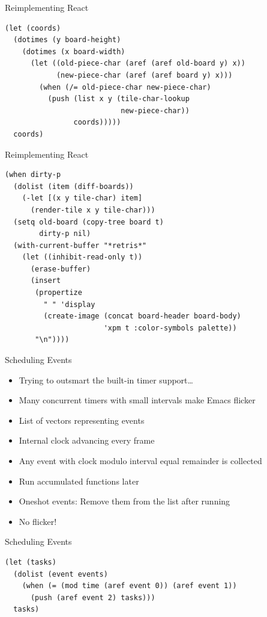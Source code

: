 \documentclass[presentation]{beamer}
\begin{document}
\begin{frame}[fragile,label=sec-4-10]{Reimplementing React}
 \begin{verbatim}
(let (coords)
  (dotimes (y board-height)
    (dotimes (x board-width)
      (let ((old-piece-char (aref (aref old-board y) x))
            (new-piece-char (aref (aref board y) x)))
        (when (/= old-piece-char new-piece-char)
          (push (list x y (tile-char-lookup
                           new-piece-char))
                coords)))))
  coords)
\end{verbatim}
\end{frame}

\begin{frame}[fragile,label=sec-4-11]{Reimplementing React}
 \begin{verbatim}
(when dirty-p
  (dolist (item (diff-boards))
    (-let [(x y tile-char) item]
      (render-tile x y tile-char)))
  (setq old-board (copy-tree board t)
        dirty-p nil)
  (with-current-buffer "*retris*"
    (let ((inhibit-read-only t))
      (erase-buffer)
      (insert
       (propertize
         " " 'display
         (create-image (concat board-header board-body)
                       'xpm t :color-symbols palette))
       "\n"))))
\end{verbatim}
\end{frame}

\begin{frame}[label=sec-4-12]{Scheduling Events}
\begin{itemize}
\item Trying to outsmart the built-in timer support\ldots{}
\item Many concurrent timers with small intervals make Emacs flicker
\item List of vectors representing events
\item Internal clock advancing every frame
\item Any event with clock modulo interval equal remainder is collected
\item Run accumulated functions later
\item Oneshot events: Remove them from the list after running
\item No flicker!
\end{itemize}
\end{frame}

\begin{frame}[fragile,label=sec-4-13]{Scheduling Events}
 \begin{verbatim}
(let (tasks)
  (dolist (event events)
    (when (= (mod time (aref event 0)) (aref event 1))
      (push (aref event 2) tasks)))
  tasks)
\end{verbatim}
\end{frame}
\end{document}
